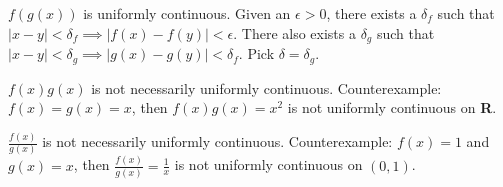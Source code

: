 \documentclass{oxmathproblems}
\begin{document}
\begin{questions}
\begin{solution}
  $f(g(x))$ is uniformly continuous.  Given an $\epsilon > 0$, there exists a $\delta_{f}$ such that $|x-y| < \delta_{f} \implies |f(x)-f(y)| < \epsilon$. There also exists a $\delta_{g}$ such that
  $|x-y| < \delta_{g} \implies |g(x)-g(y)| < \delta_{f}$. Pick $\delta=\delta_{g}$.
  
  $f(x)g(x)$ is not necessarily uniformly continuous. Counterexample: $f(x) = g(x) = x$, then $f(x)g(x) = x^2$ is not uniformly continuous on \textbf{R}.
  
  $\frac{f(x)}{g(x)}$ is not necessarily uniformly continuous. Counterexample: $f(x) = 1$ and $g(x) = x$, then $\frac{f(x)}{g(x)} = \frac{1}{x}$ is not uniformly continuous on $(0, 1)$.
\end{solution}

\end{questions}
\end{document}
